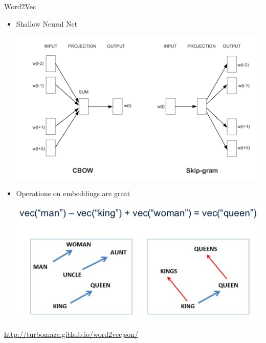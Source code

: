 \documentclass{beamer}
\begin{document}
\begin{frame}{Word2Vec}
	\begin{itemize}
		\item Shallow Neural Net
				\begin{center}
					\includegraphics[scale=0.2]{img/w2vv}
				\end{center}
				
		\item Operations on embeddings are great
		\begin{center}
			\includegraphics[scale=0.5]{img/w2v}
		\end{center}
		
	\end{itemize}
	\href{http://turbomaze.github.io/word2vecjson/}{http://turbomaze.github.io/word2vecjson/}
\end{frame}
\end{document}
